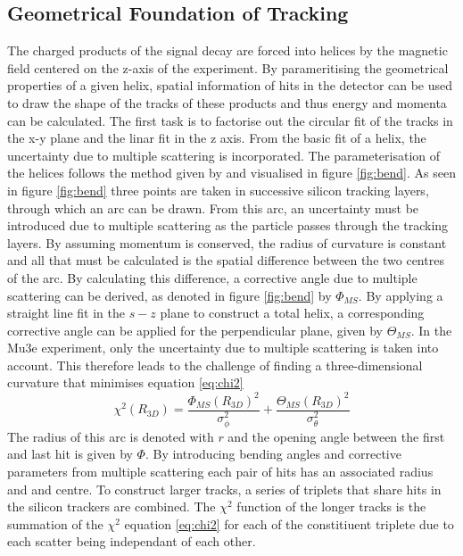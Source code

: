 \subsection*{Geometrical Foundation of Tracking}
The charged products of the signal decay are forced into helices by the magnetic field centered on the z-axis of the experiment.
By parameritising the geometrical properties of a given helix, spatial information of hits in the detector can be used to draw the shape of the tracks of these products and thus energy and momenta can be calculated.
The first task is to factorise out the circular fit of the tracks in the x-y plane and the linar fit in the z axis.
From the basic fit of a helix, the uncertainty due to multiple scattering is incorporated.
The parameterisation of the helices follows the method given by \cite{KARIMAKI1991187} and visualised in figure \ref{fig:bend}. 
As seen in figure \ref{fig:bend} three points are taken in successive silicon tracking layers, through which an arc can be drawn.
From this arc, an uncertainty must be introduced due to multiple scattering as the particle passes through the tracking layers.
By assuming momentum is conserved, the radius of curvature is constant and all that must be calculated is the spatial difference between the two centres of the arc.
By calculating this difference, a corrective angle due to multiple scattering can be derived, as denoted in figure \ref{fig:bend} by $\Phi_{MS}$.
By applying a straight line fit in the $s-z$ plane to construct a total helix, a corresponding corrective angle can be applied for the perpendicular plane, given by $\Theta_{MS}$.
In the Mu3e experiment, only the uncertainty due to multiple scattering is taken into account. This therefore leads to the challenge of finding a three-dimensional curvature that minimises equation \ref{eq:chi2}
\begin{equation}
    \chi^{2}(R_{3D}) = \frac{\Phi_{MS}(R_{3D})^2}{\sigma_\phi^2} + \frac{\Theta_{MS}(R_{3D})^2}{\sigma_\theta^2}
    \label{eq:chi2}
\end{equation}
The radius of this arc is denoted with $r$ and the opening angle between the first and last hit is given by $\Phi$.
By introducing bending angles and corrective parameters from multiple scattering each pair of hits has an associated radius and and centre.
To construct larger tracks, a series of triplets that share hits in the silicon trackers are combined. The $\chi^2$ function of the longer tracks is the summation of the $\chi^2$ equation \ref{eq:chi2} for each of the constitiuent triplete due to each scatter being independant of each other.
